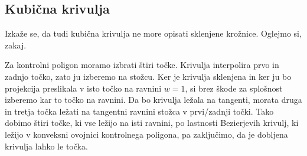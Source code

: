 \documentclass[a4paper,12pt]{article}
\begin{document}
\subsection{Kubična krivulja}
Izkaže se, da tudi kubična krivulja ne more opisati sklenjene krožnice. Oglejmo si, zakaj.

Za kontrolni poligon moramo izbrati štiri točke. Krivulja interpolira prvo in zadnjo točko, zato ju izberemo na stožcu. Ker je krivulja sklenjena in ker ju bo projekcija preslikala v isto točko na ravnini $w=1$, si brez škode za splošnost izberemo kar to točko na ravnini. Da bo krivulja ležala na tangenti, morata druga in tretja točka ležati na tangentni ravnini stožca v prvi/zadnji točki. Tako dobimo štiri točke, ki vse ležijo na isti ravnini, po lastnosti Bezierjevih krivulj, ki ležijo v konveksni ovojnici kontrolnega poligona, pa zaključimo, da je dobljena krivulja lahko le točka.
\end{document}
